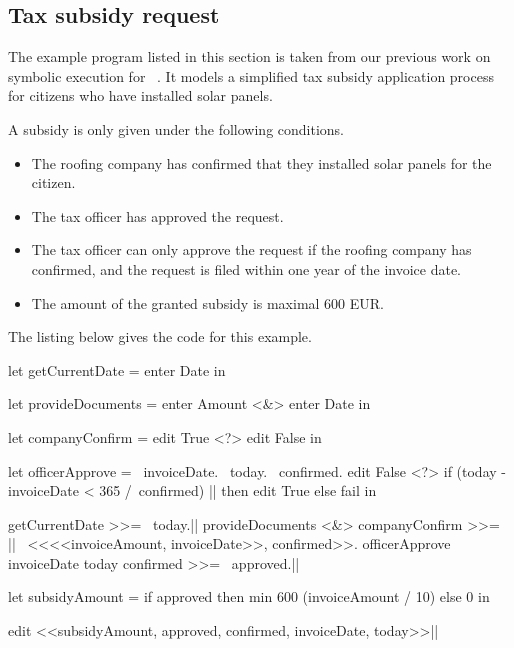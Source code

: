 \subsection{Tax subsidy request}

The example program listed in this section is taken from our previous work on symbolic execution for \TOPHAT~\cite{Steenvoorden2019}.
It models a simplified tax subsidy application process for citizens who have installed solar panels.

A subsidy is only given under the following conditions.
\begin{itemize}
\item The roofing company has confirmed that they installed solar panels for the citizen.
\item The tax officer has approved the request.
\item The tax officer can only approve the request if the roofing company has confirmed, and the request is filed within one year of the invoice date.
\item The amount of the granted subsidy is maximal 600 EUR.
\end{itemize}

The listing below gives the \TOPHAT code for this example.

\begin{TASK}[float=ht
            ,numbers=right
            ,caption=Subsidy request and approval workflow at the Dutch tax office.
            ,label=lst:tax
            ]
  let getCurrentDate = enter Date in

    let provideDocuments = enter Amount <&> enter Date in

      let companyConfirm = edit True <?> edit False in

        let officerApprove = \ invoiceDate. \ today. \ confirmed.
          edit False <?> if (today - invoiceDate < 365 /\ confirmed) |\label{lst:tax:officer-approve-def}| then edit True else fail in

            getCurrentDate >>= \ today.|\label{lst:tax:citizen-info}|
            provideDocuments <&> companyConfirm >>= |\label{lst:tax:documents-and-company-confirm}|
              \ <<<<invoiceAmount, invoiceDate>>, confirmed>>.
              officerApprove invoiceDate today confirmed >>= \ approved.|\label{lst:tax:officer-approve}|

          let subsidyAmount = if approved then min 600 (invoiceAmount / 10) else 0 in

            edit <<subsidyAmount, approved, confirmed, invoiceDate, today>>|\label{lst:tax:result}|
\end{TASK}

